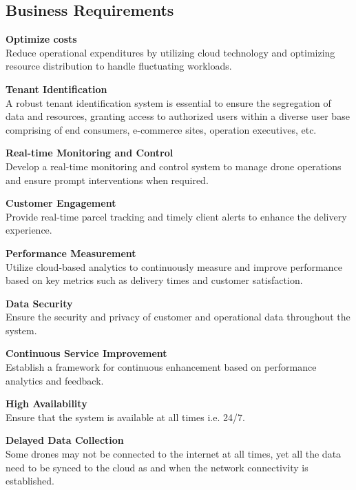 \documentclass{article}
\begin{document}
\subsection{Business Requirements}
\begin{enumerate}[label=\textbf{[BR\arabic*]}, leftmargin=3\parindent]
    \item \textbf{Optimize costs} \\ \label{BR1 - Optimize costs}Reduce operational expenditures by utilizing cloud technology and optimizing resource distribution to handle fluctuating workloads.
    \item \textbf{Tenant Identification} \\ \label{BR10 - Tenant Identification}A robust tenant identification system is essential to ensure the segregation of data and resources, granting access to authorized users within a diverse user base comprising of end consumers, e-commerce sites, operation executives, etc. 
    \item  \textbf{Real-time Monitoring and Control} \\ \label{BR3 - Real-time Monitoring and Control}Develop a real-time monitoring and control system to manage drone operations and ensure prompt interventions when required.
    \item  \textbf{Customer Engagement} \\ \label{BR4 - Customer Engagement}Provide real-time parcel tracking and timely client alerts to enhance the delivery experience.
    \item  \textbf{Performance Measurement} \\ \label{BR5 - Performance Measurement}Utilize cloud-based analytics to continuously measure and improve performance based on key metrics such as delivery times and customer satisfaction.
    \item  \textbf{Data Security} \\ \label{BR6 - Data Security}Ensure the security and privacy of customer and operational data throughout the system.
    \item \textbf{Continuous Service Improvement} \\ \label{BR7 - Continuous Service Improvement}Establish a framework for continuous enhancement based on performance analytics and feedback.
    \item \textbf{High Availability} \\ \label{BR8 - High Availability}Ensure that the system is available at all times i.e. 24/7.
    \item \textbf{Delayed Data Collection} \\ \label{BR9 - Delayed Data Collection}Some drones may not be connected to the internet at all times, yet all the data need to be synced to the cloud as and when the network connectivity is established.
\end{enumerate}
\end{document}
